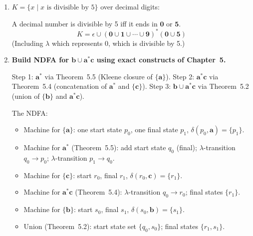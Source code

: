 \begin{enumerate}[{6.}1.]
Let $D_k=\{$digits whose value$\equiv k\pmod 3\}$: $D_0=\{0,3,6,9\}$, $D_1=\{1,4,7\}$, $D_2=\{2,5,8\}$.  The language $\Gamma$ is accepted by a DFA with states $\{q_0,q_1,q_2\}$ where $q_i$ = ``running sum $\equiv i\pmod 3$'', $q_0$ is the (only) final state.  The state equations:
\begin{align*}
  X_0 &= \epsilon \cup D_0X_0 \cup D_1X_2 \cup D_2X_1 \\
  X_1 &= D_1X_0 \cup D_2X_2 \cup D_0X_1 \\
  X_2 &= D_2X_0 \cup D_0X_2 \cup D_1X_1
\end{align*}
Solving (by Theorem~6.2): $X_0 = D_0^*(D_1X_2+D_2X_1)^*$... the full solution is a regular expression in $D_0,D_1,D_2$; the simplest form is $\Gamma=(D_0\cup D_1D_2^*D_1\cup D_2D_1^*D_2)^*$ (an approximation; the exact expression requires the full Kleene computation).

\item $K=\{x\mid x\text{ is divisible by }5\}$ over decimal digits:

A decimal number is divisible by 5 iff it ends in $\pmb{0}$ or $\pmb{5}$.
\[
  K = \epsilon \cup (\pmb{0}\cup\pmb{1}\cup\cdots\cup\pmb{9})^*(\pmb{0}\cup\pmb{5})
\]
(Including $\lambda$ which represents 0, which is divisible by 5.)

\item \textbf{Build NDFA for $\pmb{b}\cup\pmb{a}^*\pmb{c}$ using exact constructs of Chapter~5.}

Step 1: $\pmb{a}^*$ via Theorem~5.5 (Kleene closure of $\{\pmb{a}\}$).
Step 2: $\pmb{a}^*\pmb{c}$ via Theorem~5.4 (concatenation of $\pmb{a}^*$ and $\{\pmb{c}\}$).
Step 3: $\pmb{b}\cup\pmb{a}^*\pmb{c}$ via Theorem~5.2 (union of $\{\pmb{b}\}$ and $\pmb{a}^*\pmb{c}$).

The NDFA:
\begin{itemize}
  \item Machine for $\{\pmb{a}\}$: one start state $p_0$, one final state $p_1$, $\delta(p_0,\pmb{a})=\{p_1\}$.
  \item Machine for $\pmb{a}^*$ (Theorem~5.5): add start state $q_0$ (final); $\lambda$-transition $q_0\to p_0$; $\lambda$-transition $p_1\to q_0$.
  \item Machine for $\{\pmb{c}\}$: start $r_0$, final $r_1$, $\delta(r_0,\pmb{c})=\{r_1\}$.
  \item Machine for $\pmb{a}^*\pmb{c}$ (Theorem~5.4): $\lambda$-transition $q_0\to r_0$; final states $\{r_1\}$.
  \item Machine for $\{\pmb{b}\}$: start $s_0$, final $s_1$, $\delta(s_0,\pmb{b})=\{s_1\}$.
  \item Union (Theorem~5.2): start state set $\{q_0,s_0\}$; final states $\{r_1,s_1\}$.
\end{itemize}


\end{enumerate}
